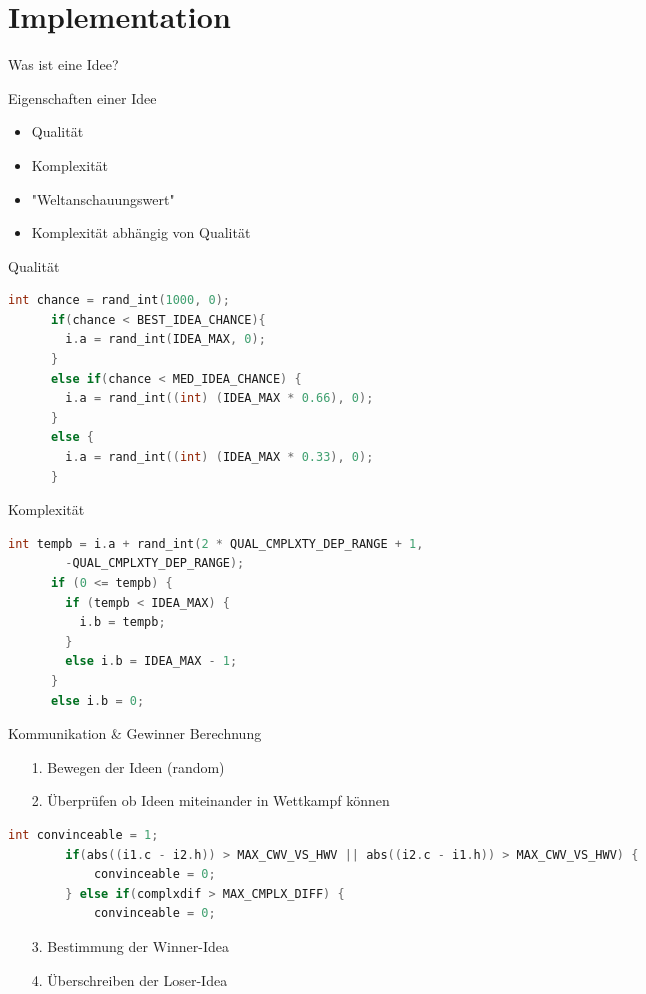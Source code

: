 \section{Implementation}

\begin{frame}{Was ist eine Idee?}
	\begin{block}{Eigenschaften einer Idee}
		\begin{itemize}
			\item Qualität
			\item Komplexität
			\item "Weltanschauungswert"
			\item Komplexität abhängig von Qualität
		\end{itemize}
	\end{block}
\end{frame}

\begin{frame}[fragile]{Qualität}
	\begin{lstlisting}[language=C,basicstyle=\small,breaklines=true,keywordstyle=\color{black}]
	 int chance = rand_int(1000, 0);
	  if(chance < BEST_IDEA_CHANCE){
	    i.a = rand_int(IDEA_MAX, 0);
	  }
	  else if(chance < MED_IDEA_CHANCE) {
	    i.a = rand_int((int) (IDEA_MAX * 0.66), 0);
	  }
	  else {
	    i.a = rand_int((int) (IDEA_MAX * 0.33), 0);
	  }
	  \end{lstlisting}
\end{frame}

\begin{frame}[fragile]{Komplexität}
	\begin{lstlisting}[language=C,basicstyle=\small,breaklines=true,keywordstyle=\color{black}]
	int tempb = i.a + rand_int(2 * QUAL_CMPLXTY_DEP_RANGE + 1, 
	    -QUAL_CMPLXTY_DEP_RANGE);
	  if (0 <= tempb) {
	    if (tempb < IDEA_MAX) {
	      i.b = tempb;
	    } 
	    else i.b = IDEA_MAX - 1;
	  } 
	  else i.b = 0;
	\end{lstlisting}
\end{frame}

\begin{frame}[fragile]{Kommunikation \& Gewinner Berechnung}
	\begin{itemize}
		\item[1.] Bewegen der Ideen (random)
		\item[2.] Überprüfen ob Ideen miteinander in Wettkampf können 
	\end{itemize}
		\begin{lstlisting}[language=C,basicstyle=\small,keywordstyle=\color{black}]
		int convinceable = 1;
		if(abs((i1.c - i2.h)) > MAX_CWV_VS_HWV || abs((i2.c - i1.h)) > MAX_CWV_VS_HWV) {
	    	convinceable = 0;
	  	} else if(complxdif > MAX_CMPLX_DIFF) {
	    	convinceable = 0;
		\end{lstlisting}	
	\begin{itemize}
		\item[3.] Bestimmung der Winner-Idea 
		\item[4.] Überschreiben der Loser-Idea
	\end{itemize}
\end{frame}


